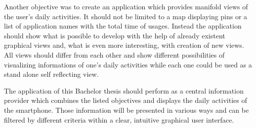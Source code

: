 Another  objective was to create an application which provides manifold views of the user's daily activities. It should not be limited to a map displaying pins or a list of application names with the total time of usages. Instead the application should show what is possible to develop with the help of already existent graphical views and, what is even more interesting, with creation of new views. All views should differ from each other and show different possibilities of visualizing informations of one's daily activities while each one could be used as a stand alone self reflecting view.

The application of this Bachelor thesis should perform as a central information provider which combines the listed objectives and displays the daily activities of the smartphone. Those information will be presented in various ways and can be filtered by different criteria within a clear, intuitive graphical user interface.